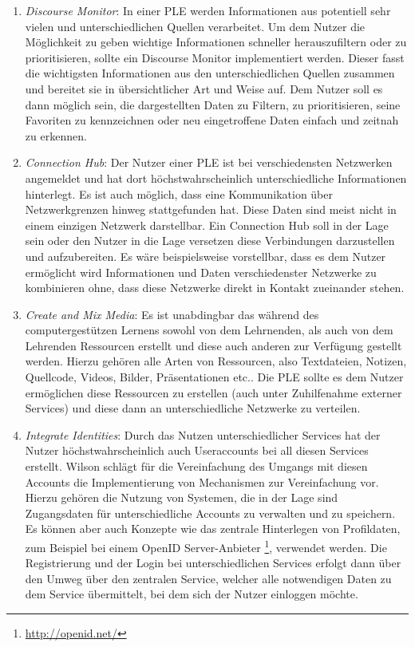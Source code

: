 \begin{enumerate}
 \item \emph{Discourse Monitor}\label{wilson_patterns:discourse_monitor}: In einer PLE werden Informationen aus potentiell sehr vielen und unterschiedlichen Quellen verarbeitet. Um dem Nutzer die Möglichkeit zu geben wichtige Informationen schneller herauszufiltern oder zu prioritisieren, sollte ein Discourse Monitor implementiert werden. Dieser fasst die wichtigsten Informationen aus den unterschiedlichen Quellen zusammen und bereitet sie in übersichtlicher Art und Weise auf. Dem Nutzer soll es dann möglich sein, die dargestellten Daten zu Filtern, zu prioritisieren, seine Favoriten zu kennzeichnen oder neu eingetroffene Daten einfach und zeitnah zu erkennen. 
 \item \emph{Connection Hub}: Der Nutzer einer PLE ist bei verschiedensten Netzwerken angemeldet und hat dort höchstwahrscheinlich unterschiedliche Informationen hinterlegt. Es ist auch möglich, dass eine Kommunikation über Netzwerkgrenzen hinweg stattgefunden hat. Diese Daten sind meist nicht in einem einzigen Netzwerk darstellbar. Ein Connection Hub soll in der Lage sein oder den Nutzer in die Lage versetzen diese Verbindungen darzustellen und aufzubereiten. Es wäre beispielsweise vorstellbar, dass es dem Nutzer ermöglicht wird Informationen und Daten verschiedenster Netzwerke zu kombinieren ohne, dass diese Netzwerke direkt in Kontakt zueinander stehen.
 \item \emph{Create and Mix Media}: Es ist unabdingbar das während des computergestützen Lernens sowohl von dem Lehrnenden, als auch von dem Lehrenden Ressourcen erstellt und diese auch anderen zur Verfügung gestellt werden. Hierzu gehören alle Arten von Ressourcen, also Textdateien, Notizen, Quellcode, Videos, Bilder, Präsentationen etc.. Die PLE sollte es dem Nutzer ermöglichen diese Ressourcen zu erstellen (auch unter Zuhilfenahme externer Services) und diese dann an unterschiedliche Netzwerke zu verteilen. 
 \item \emph{Integrate Identities}: Durch das Nutzen unterschiedlicher Services hat der Nutzer höchstwahrscheinlich auch Useraccounts bei all diesen Services erstellt. Wilson schlägt für die Vereinfachung des Umgangs mit diesen Accounts die Implementierung von Mechanismen zur Vereinfachung vor. Hierzu gehören die Nutzung von Systemen, die in der Lage sind Zugangsdaten für unterschiedliche Accounts zu verwalten und zu speichern. Es können aber auch Konzepte wie das zentrale Hinterlegen von Profildaten, zum Beispiel bei einem OpenID Server-Anbieter \footnote{\url{http://openid.net/}}, verwendet werden. Die Registrierung und der Login bei unterschiedlichen Services erfolgt dann über den Umweg über den zentralen Service, welcher alle notwendigen Daten zu dem Service übermittelt, bei dem sich der Nutzer einloggen möchte.  

\end{enumerate}
